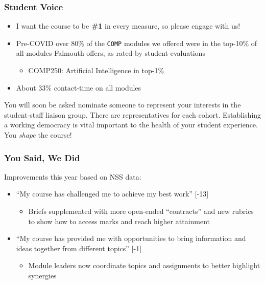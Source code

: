 \begin{frame}
	\frametitle{Student Voice}
			
	\begin{itemize}
		\item I want the course to be \textbf{\#1} in every measure, so please engage with us!
		\item Pre-COVID over 80\% of the \texttt{COMP} modules we offered were in the top-10\% of all modules Falmouth offers, as rated by student evaluations 
		\begin{itemize}
			\item COMP250: Artificial Intelligence in top-1\% 
		\end{itemize}	
		\item About 33\% contact-time on all modules
	\end{itemize}
	
	\vspace{1em}
	
	You will soon be asked nominate someone to represent your interests in the student-staff liaison group. There are representatives for each cohort. 
	Establishing a working democracy is vital important to the health of your student experience. You \textit{shape} the course!
	
\end{frame}

\begin{frame}
	\frametitle{You Said, We Did}
	
	Improvements this year based on NSS data: \pause
		
	\begin{itemize}
		\item ``My course has challenged me to achieve my best work'' [-13] 
		\begin{itemize}
			\item Briefs supplemented with more open-ended ``contracts'' and new rubrics to show how to access marks and reach higher attainment
		\end{itemize}	
		
		\pause\item ``My course has provided me with opportunities to bring information and ideas together from different topics'' [-1]
		\begin{itemize}
			\item Module leaders now coordinate topics and assignments to better highlight synergies 
		\end{itemize}	
		
	\end{itemize}
\end{frame}


